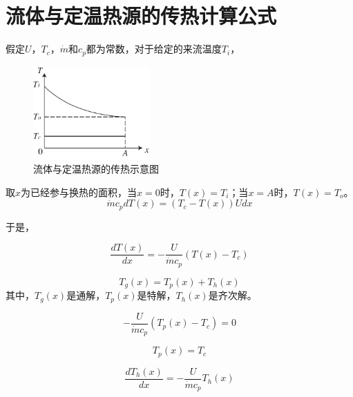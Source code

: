 \appendix

\renewcommand{\theequation}{\Alph{chapter}-\arabic{equation}}
\renewcommand{\thefigure}{\Alph{chapter}-\arabic{figure}}

\chapter{流体与定温热源的传热计算公式}
\label{cha:CTHX}

假定$U$，$T_{c}$，$\dot{m}$和$c_{p}$都为常数，对于给定的来流温度$T_{i}$，

\begin{figure}[h]
\begin{centering}
\includegraphics[width=0.4\textwidth]{fig/ConstTempHX.pdf}
\par\end{centering}
\caption{流体与定温热源的传热示意图}
\label{fig:CTHX}
\end{figure}

取$x$为已经参与换热的面积，当$x=0$时，$T(x)=T_i$；当$x=A$时，$T(x)=T_o$。
\begin{equation}
\dot{m}c_{p}dT(x)=(T_{c}-T(x))Udx
\end{equation}

于是，

\begin{equation}
\frac{dT(x)}{dx}=-\frac{U}{\dot{m}c_{p}}(T(x)-T_{c})
\end{equation}

\begin{equation}
T_{g}(x)=T_{p}(x)+T_{h}(x)
\end{equation}
其中，$T_{g}(x)$是通解，$T_{p}(x)$是特解，$T_{h}(x)$是齐次解。

\begin{equation}
-\frac{U}{\dot{m}c_{p}}(T_{p}(x)-T_{c})=0
\end{equation}

\begin{equation}
T_{p}(x)=T_{c}
\end{equation}

\begin{equation}
\frac{dT_{h}(x)}{dx}=-\frac{U}{\dot{m}c_{p}}T_{h}(x)\label{eq:T_h(x)}
\end{equation}

